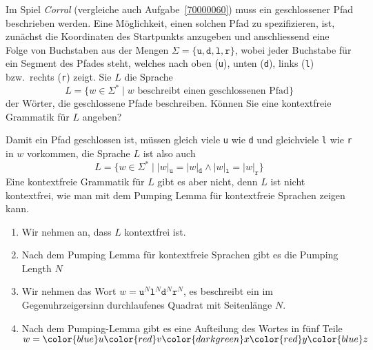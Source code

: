 Im Spiel {\em Corral} (vergleiche auch Aufgabe~\ref{70000060})
muss ein geschlossener Pfad beschrieben werden.
Eine Möglichkeit, einen solchen Pfad zu spezifizieren, ist, zunächst
die Koordinaten des Startpunkts anzugeben und anschliessend eine
Folge von Buchstaben aus der Mengen
$\Sigma=\{\texttt{u},\texttt{d},\texttt{l},\texttt{r}\}$,
wobei jeder Buchstabe für ein Segment des Pfades steht, welches 
nach oben (\texttt{u}),
unten (\texttt{d}),
links (\texttt{l})
bzw.~rechts (\texttt{r})
zeigt.
Sie $L$ die Sprache
\[
L
=
\{
w\in \Sigma^*
\;|\;
\text{$w$ beschreibt einen geschlossenen Pfad}
\}
\]
der Wörter, die geschlossene Pfade beschreiben.
Können Sie eine kontextfreie Grammatik für $L$ angeben?

\begin{loesung}
Damit ein Pfad geschlossen ist, müssen gleich viele 
\texttt{u} wie
\texttt{d} und
gleichviele
\texttt{l} wie \texttt{r} 
in $w$ vorkommen, die Sprache $L$ ist also auch
\begin{equation}
L=\{
w\in\Sigma^*
\;|\;
|w|_{\texttt{u}} = |w|_{\texttt{d}}
\wedge
|w|_{\texttt{l}} = |w|_{\texttt{r}}
\}
\label{40000073:cond}
\end{equation}
Eine kontextfreie Grammatik für $L$ gibt es aber nicht, denn
$L$ ist nicht kontextfrei, wie man mit dem Pumping Lemma für kontextfreie
Sprachen zeigen kann.

\begin{enumerate}
\item
Wir nehmen an, dass $L$ kontextfrei ist.
\item
Nach dem Pumping Lemma für kontextfreie Sprachen gibt es die
Pumping Length $N$
\item
Wir nehmen das Wort
$w= \texttt{u}^N \texttt{l}^N \texttt{d}^N \texttt{r}^N $,
es beschreibt ein im Gegenuhrzeigersinn durchlaufenes Quadrat mit
Seitenlänge $N$.
\item
Nach dem Pumping-Lemma gibt es eine Aufteilung des Wortes in
fünf Teile
$w=
{\color{blue}u}
{\color{red}v}
{\color{darkgreen}x}
{\color{red}y}
{\color{blue}z}$
\begin{center}
\end{center}
\end{enumerate}
\end{loesung}
